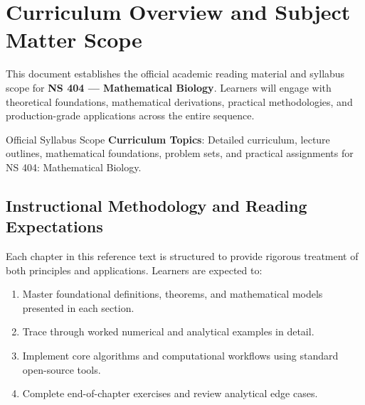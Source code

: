 \section{Curriculum Overview and Subject Matter Scope}

This document establishes the official academic reading material and syllabus scope for \textbf{NS 404 --- Mathematical Biology}. Learners will engage with theoretical foundations, mathematical derivations, practical methodologies, and production-grade applications across the entire sequence.

\begin{InsightBox}{Official Syllabus Scope}
  \textbf{Curriculum Topics}: Detailed curriculum, lecture outlines, mathematical foundations, problem sets, and practical assignments for NS 404: Mathematical Biology.
\end{InsightBox}

\subsection{Instructional Methodology and Reading Expectations}

Each chapter in this reference text is structured to provide rigorous treatment of both principles and applications. Learners are expected to:
\begin{enumerate}
  \item Master foundational definitions, theorems, and mathematical models presented in each section.
  \item Trace through worked numerical and analytical examples in detail.
  \item Implement core algorithms and computational workflows using standard open-source tools.
  \item Complete end-of-chapter exercises and review analytical edge cases.
\end{enumerate}

